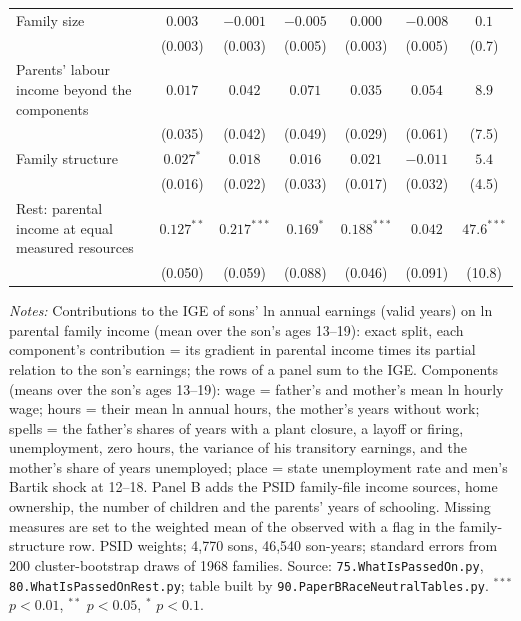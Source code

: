 \begin{table}[!htbp]
{{\begin{tabular}{lcccccc}
Family size & $0.003$ & $-0.001$ & $-0.005$ & $0.000$ & $-0.008$ & $0.1$ \\
 & (0.003) & (0.003) & (0.005) & (0.003) & (0.005) & (0.7) \\
Parents' labour income beyond the components & $0.017$ & $0.042$ & $0.071$ & $0.035$ & $0.054$ & $8.9$ \\
 & (0.035) & (0.042) & (0.049) & (0.029) & (0.061) & (7.5) \\
Family structure & $0.027^{*}$ & $0.018$ & $0.016$ & $0.021$ & $-0.011$ & $5.4$ \\
 & (0.016) & (0.022) & (0.033) & (0.017) & (0.032) & (4.5) \\
Rest: parental income at equal measured resources & $0.127^{**}$ & $0.217^{***}$ & $0.169^{*}$ & $0.188^{***}$ & $0.042$ & $47.6^{***}$ \\
 & (0.050) & (0.059) & (0.088) & (0.046) & (0.091) & (10.8) \\
\bottomrule
\end{tabular}}}
\par\smallskip
\begin{minipage}{\textwidth}\footnotesize \textit{Notes:} Contributions to the IGE of sons' ln annual earnings (valid years) on ln parental family income (mean over the son's ages 13--19): exact \citet{gelbach2016covariates} split, each component's contribution = its gradient in parental income times its partial relation to the son's earnings; the rows of a panel sum to the IGE. Components (means over the son's ages 13--19): wage = father's and mother's mean ln hourly wage; hours = their mean ln annual hours, the mother's years without work; spells = the father's shares of years with a plant closure, a layoff or firing, unemployment, zero hours, the variance of his transitory earnings, and the mother's share of years unemployed; place = state unemployment rate and men's Bartik shock at 12--18. Panel B adds the PSID family-file income sources, home ownership, the number of children and the parents' years of schooling. Missing measures are set to the weighted mean of the observed with a flag in the family-structure row. PSID weights; 4,770 sons, 46,540 son-years; standard errors from 200 cluster-bootstrap draws of 1968 families. Source: \texttt{75.WhatIsPassedOn.py}, \texttt{80.WhatIsPassedOnRest.py}; table built by \texttt{90.PaperBRaceNeutralTables.py}. $^{***}$ $p<0.01$, $^{**}$ $p<0.05$, $^{*}$ $p<0.1$.\end{minipage}
\end{table}
